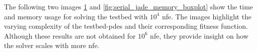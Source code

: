 \documentclass[./\jobname.tex]{subfiles}
\begin{document}
The following two images \ref{fig:serial_jade_time_boxplot} and \ref{fig:serial_jade_memory_boxplot} show the time and memory usage for solving the testbed with $10^4$ \gls{nfe}. The images highlight the varying complexity of the testbed-\gls{pde}s and their corresponding fitness function. Although these results are not obtained for $10^6$ \gls{nfe}, they provide insight on how the solver scales with more \gls{nfe}. 

\begin{figure}[H]
	\centering
	\noindent{}
	\label{fig:serial_jade_time_boxplot}
\end{figure}
\end{document}
